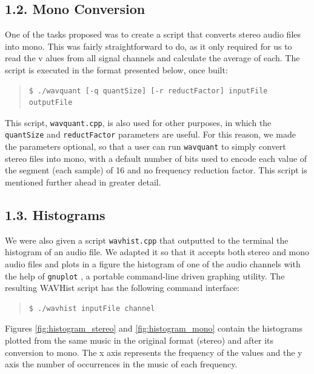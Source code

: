 \documentclass[12pt]{article}
\begin{document}
\subsection*{1.2. Mono Conversion}

One of the tasks proposed was to create a script that converts stereo audio 
files into mono.
This was fairly straightforward to do, as it only required for us to read the v
alues from all signal channels and calculate the average of each.
The script is executed in the format presented below, once built:

\begingroup
\addtolength\leftmargini{-0.4in}
\begin{quote}
\begin{verbatim}
$ ./wavquant [-q quantSize] [-r reductFactor] inputFile outputFile
\end{verbatim}
\end{quote}
\endgroup

This script, \texttt{wavquant.cpp}, is also used for other purposes, in which 
the \texttt{quantSize} and \texttt{reductFactor} parameters are useful.
For this reason, we made the parameters optional, so that a user can run 
\texttt{wavquant} to simply convert stereo files into mono, with a default 
number of bits used to encode each value of the segment (each sample) of 16 and 
no frequency reduction factor.
This script is mentioned further ahead in greater detail.

\subsection*{1.3. Histograms}

We were also given a script \texttt{wavhist.cpp} that outputted to the terminal 
the histogram of an audio file.
We adapted it so that it accepts both stereo and mono audio files and plots in 
a figure the histogram of one of the audio channels with the help of 
\texttt{gnuplot} \cite{gnuplot}, a portable command-line driven graphing utility. 
The resulting WAVHist script has the following command interface:

\begingroup
\addtolength\leftmargini{-0.4in}
\begin{quote}
\begin{verbatim}
$ ./wavhist inputFile channel
\end{verbatim}
\end{quote}
\endgroup

Figures \ref{fig:histogram_stereo} and \ref{fig:histogram_mono} contain the 
histograms plotted from the same music in the original format (stereo) and after 
its conversion to mono. 
The x axis represents the frequency of the values and the y axis the number of 
occurrences in the music of each frequency.
\end{document}
